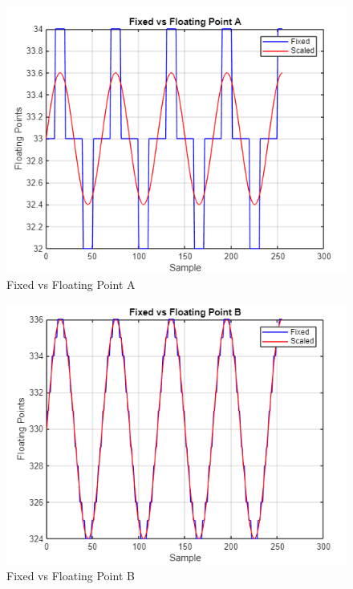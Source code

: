 \documentclass[journal]{IEEEtran}
\begin{document}
\begin{figure}[H]
    \centering
    \includegraphics[width=\linewidth]{2.1.png}
    \caption{Fixed vs Floating Point A}
    \label{fig:part2A}
\end{figure}

\begin{figure}[H]
    \centering
    \includegraphics[width=\linewidth]{2.2.png}
    \caption{Fixed vs Floating Point B}
    \label{fig:part2B}
\end{figure}
\end{document}
